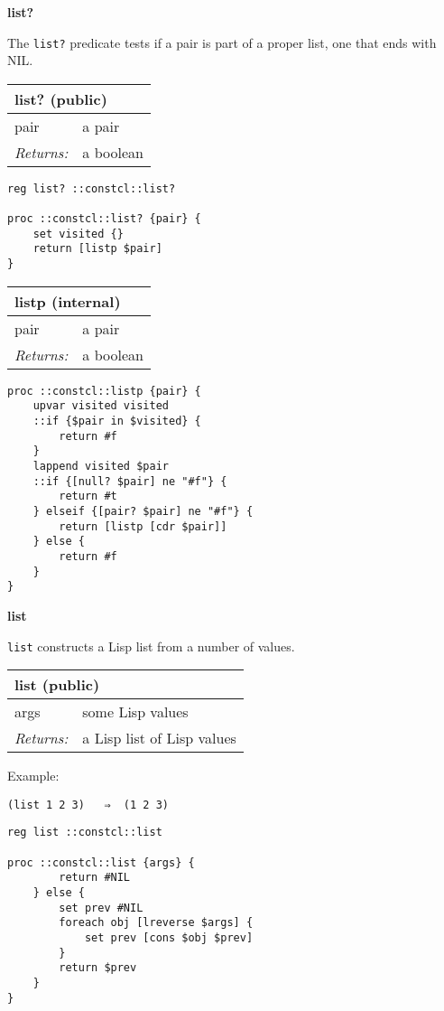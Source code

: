 \documentclass{report}
\begin{document}
\textbf{list?}


The \texttt{list?} predicate tests if a pair is part of a proper list, one that ends with NIL.

\begin{tabular}{ |l l| }
\hline
\multicolumn{2}{|l|}{list? (public)} \\
\hline
pair & a pair \\
\textit{Returns:} & a boolean \\
\hline
\end{tabular}

\noindent\makebox[\linewidth]{\rule{\linewidth}{0.4pt}}
\begin{lstlisting}
reg list? ::constcl::list?
 
proc ::constcl::list? {pair} {
    set visited {}
    return [listp $pair]
}
\end{lstlisting}
\noindent\makebox[\linewidth]{\rule{\linewidth}{0.4pt}}
\begin{tabular}{ |l l| }
\hline
\multicolumn{2}{|l|}{listp (internal)} \\
\hline
pair & a pair \\
\textit{Returns:} & a boolean \\
\hline
\end{tabular}

\noindent\makebox[\linewidth]{\rule{\linewidth}{0.4pt}}
\begin{lstlisting}
proc ::constcl::listp {pair} {
    upvar visited visited
    ::if {$pair in $visited} {
        return #f
    }
    lappend visited $pair
    ::if {[null? $pair] ne "#f"} {
        return #t
    } elseif {[pair? $pair] ne "#f"} {
        return [listp [cdr $pair]]
    } else {
        return #f
    }
}
\end{lstlisting}
\noindent\makebox[\linewidth]{\rule{\linewidth}{0.4pt}}

\textbf{list}


\texttt{list} constructs a Lisp list from a number of values.

\begin{tabular}{ |l l| }
\hline
\multicolumn{2}{|l|}{list (public)} \\
\hline
args & some Lisp values \\
\textit{Returns:} & a Lisp list of Lisp values \\
\hline
\end{tabular}


Example:

\noindent\makebox[\linewidth]{\rule{\linewidth}{0.4pt}}
\begin{lstlisting}
(list 1 2 3)   ⇒  (1 2 3)
\end{lstlisting}
\noindent\makebox[\linewidth]{\rule{\linewidth}{0.4pt}}
\noindent\makebox[\linewidth]{\rule{\linewidth}{0.4pt}}
\begin{lstlisting}
reg list ::constcl::list
 
proc ::constcl::list {args} {
        return #NIL
    } else {
        set prev #NIL
        foreach obj [lreverse $args] {
            set prev [cons $obj $prev]
        }
        return $prev
    }
}
\end{lstlisting}
\noindent\makebox[\linewidth]{\rule{\linewidth}{0.4pt}}
\end{document}
